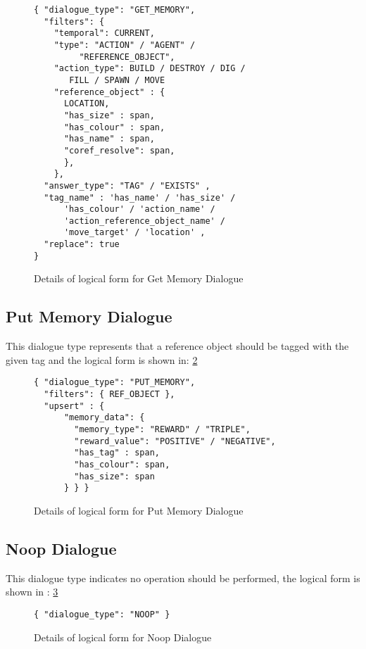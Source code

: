 \begin{figure}[ht]
    \centering
   \fontsize{8pt}{8pt}\selectfont
    
    \begin{verbatim}
{ "dialogue_type": "GET_MEMORY",
  "filters": {
    "temporal": CURRENT,
    "type": "ACTION" / "AGENT" / 
         "REFERENCE_OBJECT",
    "action_type": BUILD / DESTROY / DIG / 
       FILL / SPAWN / MOVE
    "reference_object" : {
      LOCATION,
      "has_size" : span,
      "has_colour" : span,
      "has_name" : span,
      "coref_resolve": span,
      },
    },
  "answer_type": "TAG" / "EXISTS" ,
  "tag_name" : 'has_name' / 'has_size' /
      'has_colour' / 'action_name' / 
      'action_reference_object_name' / 
      'move_target' / 'location' ,
  "replace": true
}
    \end{verbatim}
    \vspace{-20pt}
    \caption{Details of logical form for Get Memory Dialogue}
    \vspace{-8pt}
    \label{fig:answer_dict}
\end{figure}


\subsection{Put Memory Dialogue}
This dialogue type represents that a reference object should be tagged with the given tag and the logical form is shown in: \ref{fig:tag_dict}


\begin{figure}[ht]
    \centering
    \fontsize{8pt}{8pt}\selectfont
    \begin{verbatim}
{ "dialogue_type": "PUT_MEMORY",
  "filters": { REF_OBJECT },
  "upsert" : {
      "memory_data": {
        "memory_type": "REWARD" / "TRIPLE",
        "reward_value": "POSITIVE" / "NEGATIVE",
        "has_tag" : span,
        "has_colour": span,
        "has_size": span
      } } }
    \end{verbatim}
    \vspace{-20pt}
    \caption{Details of logical form for Put Memory Dialogue}
    \vspace{-8pt}
    \label{fig:tag_dict}
\end{figure}



\subsection{ Noop Dialogue}
This dialogue type indicates no operation should be performed, the logical form is shown in : \ref{fig:noop_dict}

\begin{figure}[ht]
    \centering
    \fontsize{8pt}{8pt}\selectfont
    \begin{verbatim}
{ "dialogue_type": "NOOP" }
    \end{verbatim}
    \vspace{-20pt}
    \caption{Details of logical form for Noop Dialogue}
    \vspace{-8pt}
    \label{fig:noop_dict}
\end{figure}
